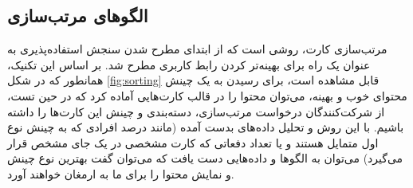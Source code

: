 \subsection{الگوهای مرتب‌سازی}
مرتب‌سازی کارت، روشی است که از ابتدای مطرح شدن سنجش استفاده‌پذیری به عنوان یک راه برای بهینه‌تر کردن رابط کاربری مطرح شد. بر اساس این تکنیک، همانطور که در شکل
\ref{fig:sorting}
قابل مشاهده است، برای رسیدن به یک چینش محتوای خوب و بهینه، می‌توان محتوا را در قالب کارت‌هایی آماده کرد که در حین تست، از شرکت‌کنندگان درخواست مرتب‌سازی، دسته‌بندی و چینش این کارت‌ها را داشته باشیم. با این روش  و تحلیل داده‌های بدست آمده (مانند درصد افرادی که به چینش نوع اول متمایل هستند و یا تعداد دفعاتی که کارت مشخصی در یک جای مشخص قرار می‌گیرد) می‌توان به الگوها و داده‌هایی دست یافت که می‌توان گفت بهترین نوع چینش و نمایش محتوا را برای ما به ارمغان خواهند آورد.
\begin{figure}[H]
	\centering
	\hspace{0mm}
	\hspace{0mm}
\end{figure}
